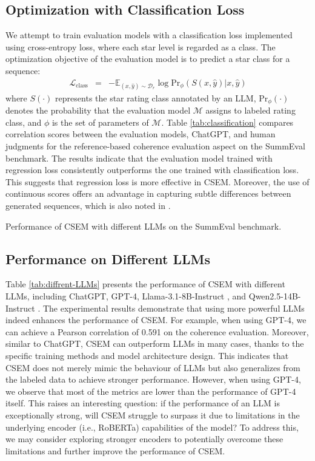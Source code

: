 \documentclass[lettersize,journal]{IEEEtran}
\begin{document}
\subsection{Optimization with Classification Loss} \label{sec:classification}
We attempt to train evaluation models with a classification loss implemented using cross-entropy loss, where each star level is regarded as a class.
The optimization objective of the evaluation model is to predict a star class for a sequence:
\begin{eqnarray}
    \mathcal{L}_{\mathrm{class}}&=&-\mathbb{E}_{(x,\hat{y})\sim \mathcal{D}_{r}}\log \mathrm{Pr}_{\phi}(S(x,\hat{y})|x,\hat{y})
\end{eqnarray}
where $S(\cdot)$ represents the star rating class annotated by an LLM, $\mathrm{Pr}_{\phi}(\cdot)$ denotes the probability that the evaluation model $\mathcal{M}$ assigns to labeled rating class, and $\phi$ is the set of parameters of $\mathcal{M}$.
Table \ref{tab:classification} compares correlation scores between the evaluation models, ChatGPT, and human judgments for the reference-based coherence evaluation aspect on the SummEval benchmark. The results indicate that the evaluation model trained with regression loss consistently outperforms the one trained with classification loss. This suggests that regression loss is more effective in CSEM. Moreover, the use of continuous scores offers an advantage in capturing subtle differences between generated sequences, which is also noted in \cite{liu2023gpteval}.

\begin{table}[!t]
    \centering
    \caption{Performance of CSEM with different LLMs on the SummEval benchmark.}
    \scalebox{0.80}{
    }
    \label{tab:diffrent-LLMs}
\end{table}

\subsection{Performance on Different LLMs}
Table \ref{tab:diffrent-LLMs} presents the performance of CSEM with different LLMs, including ChatGPT, GPT-4, Llama-3.1-8B-Instruct \cite{grattafiori2024llama}, and Qwen2.5-14B-Instruct \cite{yang2024qwen2}. The experimental results demonstrate that using more powerful LLMs indeed enhances the performance of CSEM. For example, when using GPT-4, we can achieve a Pearson correlation of 0.591 on the coherence evaluation. Moreover, similar to ChatGPT, CSEM can outperform LLMs in many cases, thanks to the specific training methods and model architecture design. This indicates that CSEM does not merely mimic the behaviour of LLMs but also generalizes from the labeled data to achieve stronger performance. However, when using GPT-4, we observe that most of the metrics are lower than the performance of GPT-4 itself. This raises an interesting question: if the performance of an LLM is exceptionally strong, will CSEM struggle to surpass it due to limitations in the underlying encoder (i.e., RoBERTa) capabilities of the model? To address this, we may consider exploring stronger encoders to potentially overcome these limitations and further improve the performance of CSEM.
\end{document}

